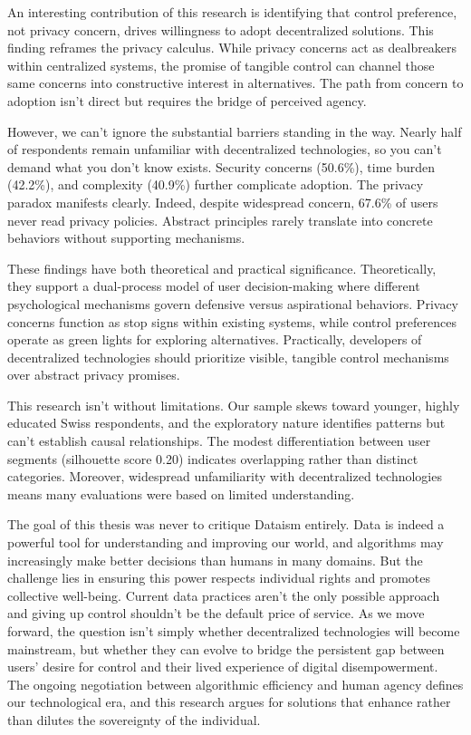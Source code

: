 An interesting contribution of this research is identifying that control preference, not privacy concern, drives willingness to adopt decentralized solutions. This finding reframes the privacy calculus. While privacy concerns act as dealbreakers within centralized systems, the promise of tangible control can channel those same concerns into constructive interest in alternatives. The path from concern to adoption isn't direct but requires the bridge of perceived agency.

However, we can't ignore the substantial barriers standing in the way. Nearly half of respondents remain unfamiliar with decentralized technologies, so you can't demand what you don't know exists. Security concerns (50.6\%), time burden (42.2\%), and complexity (40.9\%) further complicate adoption. The privacy paradox manifests clearly. Indeed, despite widespread concern, 67.6\% of users never read privacy policies. Abstract principles rarely translate into concrete behaviors without supporting mechanisms.

These findings have both theoretical and practical significance. Theoretically, they support a dual-process model of user decision-making where different psychological mechanisms govern defensive versus aspirational behaviors. Privacy concerns function as stop signs within existing systems, while control preferences operate as green lights for exploring alternatives. Practically, developers of decentralized technologies should prioritize visible, tangible control mechanisms over abstract privacy promises.

This research isn't without limitations. Our sample skews toward younger, highly educated Swiss respondents, and the exploratory nature identifies patterns but can't establish causal relationships. The modest differentiation between user segments (silhouette score 0.20) indicates overlapping rather than distinct categories. Moreover, widespread unfamiliarity with decentralized technologies means many evaluations were based on limited understanding.

The goal of this thesis was never to critique Dataism entirely. Data is indeed a powerful tool for understanding and improving our world, and algorithms may increasingly make better decisions than humans in many domains. But the challenge lies in ensuring this power respects individual rights and promotes collective well-being. Current data practices aren't the only possible approach and giving up control shouldn't be the default price of service. As we move forward, the question isn't simply whether decentralized technologies will become mainstream, but whether they can evolve to bridge the persistent gap between users' desire for control and their lived experience of digital disempowerment. The ongoing negotiation between algorithmic efficiency and human agency defines our technological era, and this research argues for solutions that enhance rather than dilutes the sovereignty of the individual.
